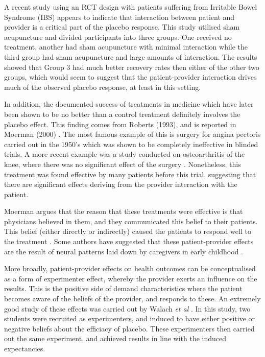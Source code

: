 A recent study \cite{Kaptchuk2008}  using an RCT design with patients suffering from Irritable Bowel Syndrome (IBS) appears to indicate that interaction between patient and provider is a critical part of the placebo response. This study utilised sham acupuncture and divided participants into three groups. One received no treatment, another had sham acupuncture with minimal interaction while the third group had sham acupuncture and large amounts of interaction. The results showed that Group 3 had much better recovery rates then either of the other two groups, which would seem to suggest that the patient-provider interaction drives much of the observed placebo response, at least in this setting.  

In addition, the documented success of treatments in medicine which have later been shown to be no better than a control treatment definitely involves the placebo effect. This finding comes from Roberts (1993), and is reported in Moerman (2000) \cite{Moerman2000a}.  The most famous example of this is surgery for angina pectoris carried out in the 1950's which was shown to be completely ineffective in blinded trials. A more recent example was a study conducted on osteoarthritis of the knee, where there was no significant effect of the surgery \cite{horng2002placebo}. Nonetheless, this treatment was found effective by many patients before this trial, suggesting that there are significant effects deriving from the provider interaction with the patient.  

Moerman argues that the reason that these treatments were effective is that physicians believed in them, and they communicated this belief to their patients. 
This belief (either directly or indirectly) caused the patients to respond well to the treatment \cite{Moerman2000}. Some authors have suggested that these patient-provider effects are the result of neural patterns laid down by caregivers in early childhood \cite{Kradin2004}.

More broadly, patient-provider effects on health outcomes can be conceptualised as a form of experimenter effect, whereby the provider exerts an influence on the results. This is the positive side of demand characteristics where the patient becomes aware of the beliefs of the provider, and responds to these. An extremely good study of these effects was carried out by Walach \textit{et al} \cite{Walach2002}. In this study, two students were recruited as experimenters, and induced to have either positive or negative beliefs about the efficiacy of placebo. These experimenters then carried out the same experiment, and achieved results in line with the induced expectancies. 


